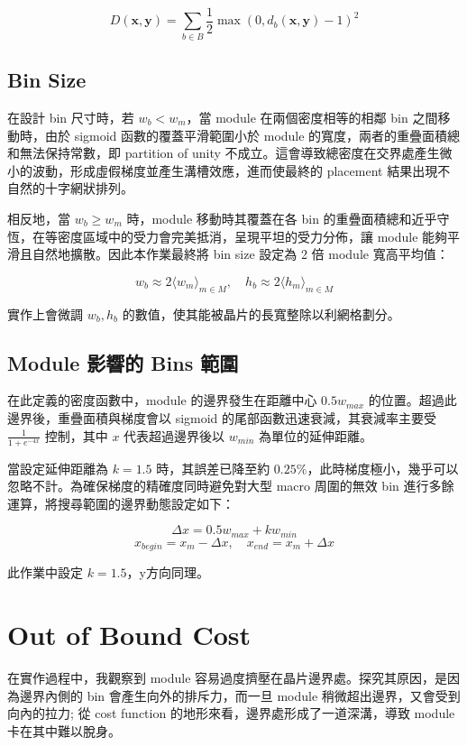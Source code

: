 \documentclass[12pt]{article}
\begin{document}
$$D(\mathbf x, \mathbf y) = \sum_{b \in B}\frac12\max(0, d_b(\mathbf x, \mathbf y) - 1)^2$$

\subsection{Bin Size}

在設計 bin 尺寸時，若 $w_b < w_m$，當 module 在兩個密度相等的相鄰 bin 之間移動時，由於 sigmoid 函數的覆蓋平滑範圍小於 module 的寬度，兩者的重疊面積總和無法保持常數，即 partition of unity 不成立。這會導致總密度在交界處產生微小的波動，形成虛假梯度並產生溝槽效應，進而使最終的 placement 結果出現不自然的十字網狀排列。

相反地，當 $w_b \ge w_m$ 時，module 移動時其覆蓋在各 bin 的重疊面積總和近乎守恆，在等密度區域中的受力會完美抵消，呈現平坦的受力分佈，讓 module 能夠平滑且自然地擴散。因此本作業最終將 bin size 設定為 2 倍 module 寬高平均值：

$$w_b \approx 2 \langle w_m \rangle_{m \in M}, \quad h_b \approx 2 \langle h_m \rangle_{m \in M}$$

實作上會微調 $w_b, h_b$ 的數值，使其能被晶片的長寬整除以利網格劃分。

\subsection{Module 影響的 Bins 範圍}

在此定義的密度函數中，module 的邊界發生在距離中心 $0.5 w_{max}$ 的位置。超過此邊界後，重疊面積與梯度會以 sigmoid 的尾部函數迅速衰減，其衰減率主要受 $\frac{1}{1 + e^{-4x}}$ 控制，其中 $x$ 代表超過邊界後以 $w_{min}$ 為單位的延伸距離。

當設定延伸距離為 $k = 1.5$ 時，其誤差已降至約 $0.25\%$，此時梯度極小，幾乎可以忽略不計。為確保梯度的精確度同時避免對大型 macro 周圍的無效 bin 進行多餘運算，將搜尋範圍的邊界動態設定如下：

$$\Delta x = 0.5 w_{max} + k w_{min}$$
$$x_{begin} = x_m - \Delta x, \quad x_{end} = x_m + \Delta x$$

此作業中設定 $k = 1.5$，y方向同理。

\section{Out of Bound Cost}

在實作過程中，我觀察到 module 容易過度擠壓在晶片邊界處。探究其原因，是因為邊界內側的 bin 會產生向外的排斥力，而一旦 module 稍微超出邊界，又會受到向內的拉力; 從 cost function 的地形來看，邊界處形成了一道深溝，導致 module 卡在其中難以脫身。
\end{document}
